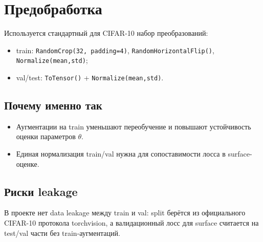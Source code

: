 \section{Предобработка}

Используется стандартный для CIFAR-10 набор преобразований:
\begin{itemize}
    \item train: \texttt{RandomCrop(32, padding=4)}, \texttt{RandomHorizontalFlip()}, \texttt{Normalize(mean,std)};
    \item val/test: \texttt{ToTensor()} + \texttt{Normalize(mean,std)}.
\end{itemize}

\subsection{Почему именно так}
\begin{itemize}
    \item Аугментации на train уменьшают переобучение и повышают устойчивость оценки параметров $\theta$.
    \item Единая нормализация train/val нужна для сопоставимости лосса в surface-оценке.
\end{itemize}

\subsection{Риски leakage}
В проекте нет data leakage между train и val: split берётся из официального CIFAR-10 протокола torchvision, а валидационный лосс для surface считается на test/val части без train-аугментаций.
